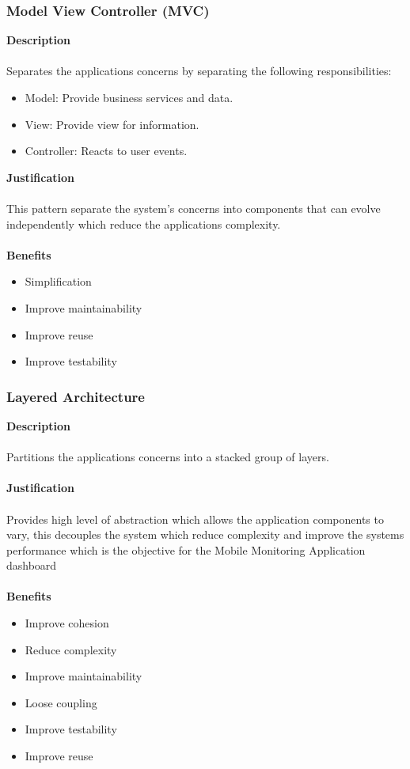 \documentclass[hidelinks, 12pt, oneside]{article}
\begin{document}
    \subsubsection{Model View Controller (MVC)}
    \textbf{Description}\\\\
    Separates the applications concerns by separating the following responsibilities:
    \begin{itemize}
    \item Model: Provide business services and data.
    \item View: Provide view for information.
    \item Controller: Reacts to user events. 
    \end{itemize}
    \textbf{Justification}\\\\
    This pattern separate the system's concerns into components that can evolve independently which reduce the applications complexity.\\\\
    \textbf{Benefits}
    \begin{itemize}
    \item Simplification
    \item Improve maintainability
    \item Improve reuse
    \item Improve testability 
	\end{itemize} 
	
	\newpage
	\subsubsection{Layered Architecture}
	\textbf{Description}\\\\
	Partitions the applications concerns into a stacked group of layers.\\\\
	\textbf{Justification}\\\\
	Provides high level of abstraction which allows the application components to vary, this decouples the system which reduce complexity and improve the systems performance which is the objective for the Mobile Monitoring Application dashboard\\\\
	\textbf{Benefits}
	\begin{itemize}
	\item Improve cohesion
	\item Reduce complexity
	\item Improve maintainability
	\item Loose coupling
	\item Improve testability
	\item Improve reuse
	\end{itemize}
	\newpage
\end{document}
